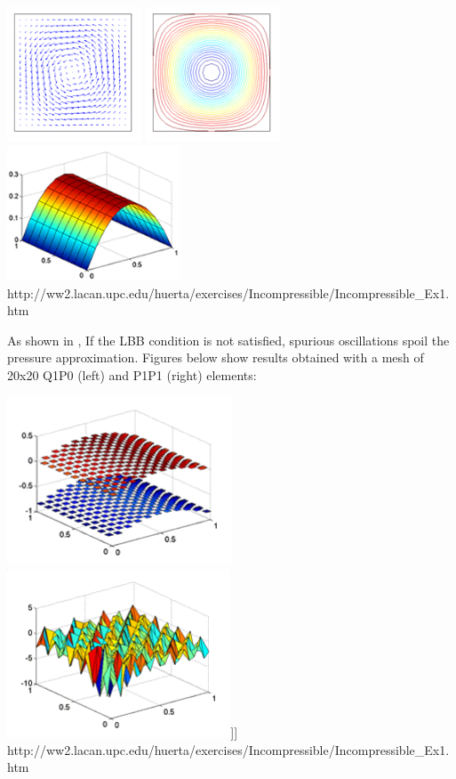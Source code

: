 \begin{center}
\includegraphics[height=4cm]{images/mms/Ex1_Q2Q1_velo.png}
\includegraphics[height=4cm]{images/mms/Ex1_Q2Q1_streamlines.png}
\includegraphics[height=4cm]{images/mms/Ex1_Q2Q1_pres.png}\\
{\small http://ww2.lacan.upc.edu/huerta/exercises/Incompressible/Incompressible\_Ex1.htm}
\end{center}

As shown in \cite{dohu03}, If the LBB condition is not satisfied, spurious oscillations spoil the pressure approximation. 
Figures below show results obtained with a mesh of 20x20 Q1P0 (left) and P1P1 (right) elements:
\begin{center}
\includegraphics[height=5cm]{images/mms/Ex1_Q1P0_pres.png}
\includegraphics[height=5cm]{images/mms/Ex1_P1P1_pres.png}]]
{\small http://ww2.lacan.upc.edu/huerta/exercises/Incompressible/Incompressible\_Ex1.htm}
\end{center}

